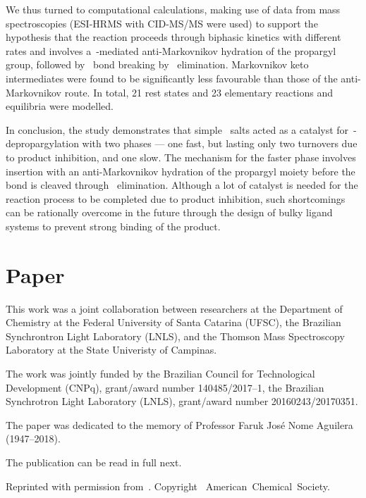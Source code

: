 We thus turned to computational calculations,
making use of data from mass spectroscopies (ESI-HRMS with CID-MS/MS were used) to support the hypothesis
that the reaction proceeds through biphasic kinetics with different rates
and
involves a~-mediated anti-Markovnikov hydration of the propargyl group,
followed by~ bond breaking by~ elimination.
Markovnikov keto intermediates were found to be significantly less favourable than those of the anti-Markovnikov route.
In total, 21 rest states and 23 elementary reactions and equilibria were modelled.

In conclusion,
the study demonstrates that
simple~ salts acted as a catalyst for~-depropargylation with two phases --- one fast,
but lasting only two turnovers due to product inhibition,
and one slow.
The mechanism for the faster phase involves~ insertion
with an anti-Markovnikov hydration of the propargyl moiety before the~ bond is cleaved
through~ elimination.
Although a lot of catalyst is needed for the reaction process to be completed due to product inhibition,
such shortcomings can be rationally overcome in the future
through the design of bulky ligand systems
to prevent strong binding of the product.

\section{Paper}

This work was a joint collaboration between researchers
at the Department of Chemistry at the Federal University of Santa Catarina (UFSC),
the Brazilian Synchrontron Light Laboratory (LNLS),
and the Thomson Mass Spectroscopy Laboratory at the State Univeristy of Campinas.

The work was jointly funded by the Brazilian Council for Technological Development (CNPq),
grant/award number 140485/2017--1,
the Brazilian Synchrotron Light Laboratory (LNLS),
grant/award number 20160243/20170351.

The paper was dedicated to the memory of Professor Faruk José Nome Aguilera (1947--2018).

The publication can be read in full next.

Reprinted with permission from~.
Copyright~\citeyear{Coelho_2019}
American~Chemical~Society.


